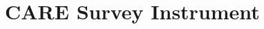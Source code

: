 \chapter{CARE Survey Instrument}
\label{app:care-survey}

\newcommand{\ratingTable}{
	\vspace{0.5em}
	\begin{center}
		\begin{tabular}{c c c c c c}
			$\bigcirc$                                    & $\bigcirc$ & $\bigcirc$ & $\bigcirc$ & $\bigcirc$ & $\bigcirc$ \\

			{\small \hspace{1em} Poor \hspace{1em}}       &
			{\small \hspace{1em} Fair \hspace{1em}}       &
			{\small \hspace{1em} Good \hspace{1em}}       &
			{\small \hspace{1em} Very Good \hspace{1em}}  &
			{\small \hspace{1em} Excellent  \hspace{1em}} &
			{\small \hspace{1em} Does Not Apply \hspace{1em}}                                                              \\
		\end{tabular}
	\end{center}
	\vspace{1em}
}

